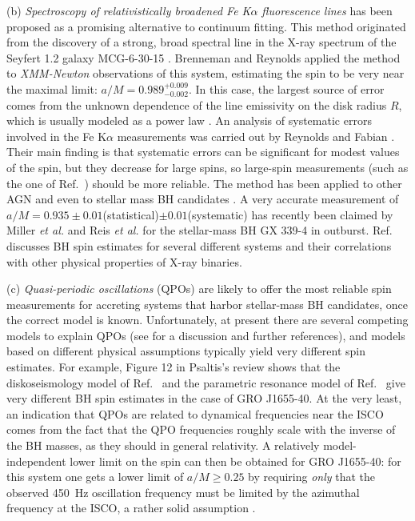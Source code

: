 \documentclass[]{iopart}
\begin{document}
\noindent
(b) {\it Spectroscopy of relativistically broadened Fe K$\alpha$ fluorescence
  lines} has been proposed as a promising alternative to continuum
fitting. This method originated from the discovery of a strong, broad spectral
line in the X-ray spectrum of the Seyfert 1.2 galaxy MCG-6-30-15
\cite{Tanaka:1995en}. Brenneman and Reynolds \cite{Brenneman:2006hw} applied
the method to {\it XMM-Newton} observations of this system, estimating the
spin to be very near the maximal limit: $a/M=0.989^{+0.009}_{-0.002}$. In this
case, the largest source of error comes from the unknown dependence of the
line emissivity on the disk radius $R$, which is usually modeled as a power
law \cite{Narayan:2005ie}. An analysis of systematic errors involved in the Fe
K$\alpha$ measurements was carried out by Reynolds and Fabian
\cite{Reynolds:2007rx}.  Their main finding is that systematic errors can be
significant for modest values of the spin, but they decrease for large spins,
so large-spin measurements (such as the one of Ref.~\cite{Brenneman:2006hw})
should be more reliable. The method has been applied to other AGN
\cite{Nandra:1996vv,Nandra:2006mf,Nandra:2007rp,Reeves:2006ne} and even to
stellar mass BH candidates \cite{Miller:2006te}. A very accurate measurement
of $a/M=0.935\pm 0.01$(statistical)$\pm 0.01$(systematic) has recently been
claimed by Miller {\it et al.}  \cite{Miller:2008vc} and Reis {\it et al.}
\cite{Reis:2008ja} for the stellar-mass BH GX 339-4 in
outburst. Ref.~\cite{Miller:2009cw} discusses BH spin estimates for several
different systems and their correlations with other physical properties of
X-ray binaries.

\noindent
(c) {\it Quasi-periodic oscillations} (QPOs) are likely to offer the most
reliable spin measurements for accreting systems that harbor stellar-mass BH
candidates, once the correct model is known. Unfortunately, at present there
are several competing models to explain QPOs (see
\cite{Remillard:2006fc,Psaltis:2008bb,Rezzolla:2003zx} for a discussion and
further references), and models based on different physical assumptions
typically yield very different spin estimates. For example, Figure 12 in
Psaltis's review \cite{Psaltis:2008bb} shows that the diskoseismology model of
Ref.~\cite{Wagoner:2001uj} and the parametric resonance model of
Ref.~\cite{Abramowicz:2001bi} give very different BH spin estimates in the
case of GRO J1655-40. At the very least, an indication that QPOs are related
to dynamical frequencies near the ISCO comes from the fact that the QPO
frequencies roughly scale with the inverse of the BH masses, as they should in
general relativity. A relatively model-independent lower limit on the spin can
then be obtained for GRO J1655-40: for this system one gets a lower limit of
$a/M\geq 0.25$ by requiring {\it only} that the observed 450~Hz oscillation
frequency must be limited by the azimuthal frequency at the ISCO, a rather
solid assumption \cite{Strohmayer:2001yn}.
\end{document}
